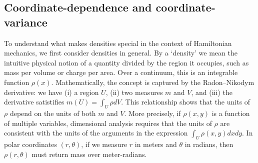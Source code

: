 \documentclass[letterpaper]{article}
\begin{document}
\subsection{Coordinate-dependence and coordinate-variance}
\label{dependence}


To understand what makes densities special in the context of Hamiltonian mechanics, we first consider densities in general. By a `density' we mean the intuitive physical notion of a quantity divided by the region it occupies, such as mass per volume or charge per area. Over a continuum, this is an integrable function $\rho(x)$. Mathematically, the concept is captured by the Radon–Nikodym derivative: we have (i) a region $U$, (ii) two measures $m$ and $V$, and (iii) the derivative satistifies $m(U) = \int_U \rho dV$. This relationship shows that the units of $\rho$ depend on the units of both $m$ and $V$. More precisely, if $\rho(x, y)$ is a function of multiple variables, dimensional analysis requires that the units of $\rho$ are consistent with the units of the arguments in the expression $\int_U \rho(x, y) dx dy$. In polar coordinates $(r, \theta)$, if we measure $r$ in meters and $\theta$ in radians, then $\rho(r, \theta)$ must return mass over meter-radians.
\end{document}
